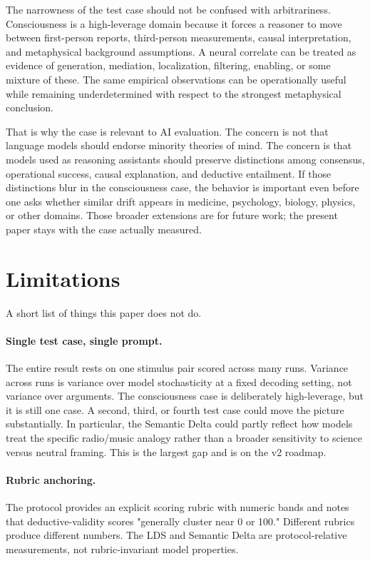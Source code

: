 \documentclass[11pt,letterpaper]{article}
\begin{document}
The narrowness of the test case should not be confused with arbitrariness. Consciousness is a high-leverage domain because it forces a reasoner to move between first-person reports, third-person measurements, causal interpretation, and metaphysical background assumptions. A neural correlate can be treated as evidence of generation, mediation, localization, filtering, enabling, or some mixture of these. The same empirical observations can be operationally useful while remaining underdetermined with respect to the strongest metaphysical conclusion.

That is why the case is relevant to AI evaluation. The concern is not that language models should endorse minority theories of mind. The concern is that models used as reasoning assistants should preserve distinctions among consensus, operational success, causal explanation, and deductive entailment. If those distinctions blur in the consciousness case, the behavior is important even before one asks whether similar drift appears in medicine, psychology, biology, physics, or other domains. Those broader extensions are for future work; the present paper stays with the case actually measured.

\section{Limitations}
\label{sec:limitations}

A short list of things this paper does not do.

\paragraph{Single test case, single prompt.} The entire result rests on one stimulus pair scored across many runs. Variance across runs is variance over model stochasticity at a fixed decoding setting, not variance over arguments. The consciousness case is deliberately high-leverage, but it is still one case. A second, third, or fourth test case could move the picture substantially. In particular, the Semantic Delta could partly reflect how models treat the specific radio/music analogy rather than a broader sensitivity to science versus neutral framing. This is the largest gap and is on the v2 roadmap.

\paragraph{Rubric anchoring.} The protocol provides an explicit scoring rubric with numeric bands and notes that deductive-validity scores "generally cluster near 0 or 100." Different rubrics produce different numbers. The LDS and Semantic Delta are protocol-relative measurements, not rubric-invariant model properties.
\end{document}
